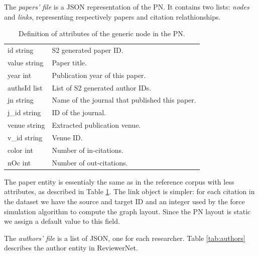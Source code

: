 The \emph{papers' file} is a JSON representation of the PN. It contains two lists: \textit{nodes} and \textit{links}, representing respectively papers and citation relathionships. 
\begin{table}[!ht]
    \centering
    \begin{tabular}{ll}
    id {\color[HTML]{656565}string}    & S2 generated paper ID.           \\ 
    value {\color[HTML]{656565}string} & Paper title.                      \\
    year {\color[HTML]{656565}int}     & Publication year of this paper.   \\
    authsId {\color[HTML]{656565}list} & List of S2 generated author IDs.  \\                
    jn {\color[HTML]{656565}string}                                          & Name of the journal that published this paper. \\
    j\_id {\color[HTML]{656565}string}                                        & ID of the journal.                             \\
    venue {\color[HTML]{656565}string}                                       & Extracted publication venue.                   \\
    v\_id {\color[HTML]{656565}string}                                        & Venue ID.                                      \\
    color {\color[HTML]{656565}int}    & Number of in-citations.            \\  
    nOc {\color[HTML]{656565}int} & Number of out-citations. 
\end{tabular}
    \caption{Definition of attributes of the generic node in the PN. \label{tab:nodes}}
   
    \end{table}

    The paper entity is essentialy the same as in the reference corpus with less attributes, as described in Table \ref{tab:nodes}. The link object is simpler: for each citation in the dataset we have the source and target ID and an integer used by the force simulation algorithm to compute the graph layout. Since the PN layout is static we assign a default value to this field. 
    
    The \emph{authors' file} is a list of JSON, one for each researcher. Table \ref{tab:authors} describes the author entity in ReviewerNet.

